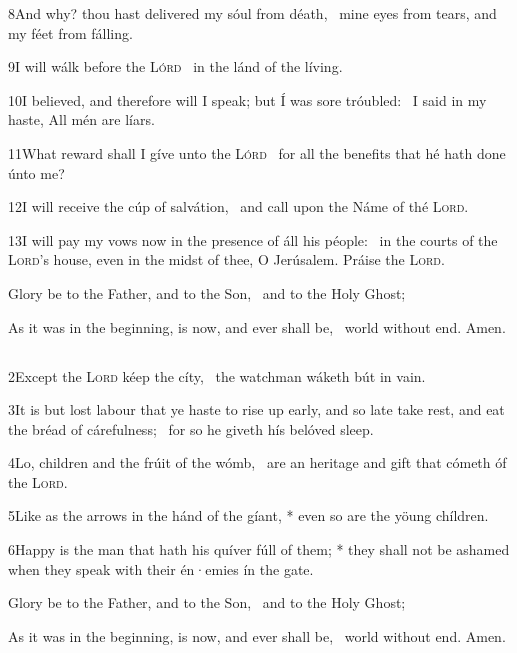 8\enspace And why? thou hast delivered my  sóul from déath, \star\ mine eyes from tears, and my féet from fálling.

9\enspace I will wálk before the {\scshape Lórd} \star\  in the lánd  of the líving.

10\enspace I believed, and therefore will I speak; but Í  was sore tróubled: \star\  I said in my haste, All mén are líars.

11\enspace What reward shall I gíve unto the {\scshape Lórd} \star\  for all the benefits that hé hath done únto me?

12\enspace I will receive the cúp of salvátion, \star\  and call upon the Náme of thé {\scshape Lord}.

13\enspace I will pay my vows now in the presence of áll his péople: \star\   in the courts of the {\scshape Lord}’s house, even in the midst of thee, O Jerúsalem. Práise the {\scshape Lord}.

Glory be to the Father, and to the Son, \star\  and to the Holy Ghost;

As it was in the beginning, is now, and ever shall be, \star\  world without end. Amen.

\medskip
\centerline{}
\subsection[{Psalm 127}]{}

2\enspace Except the {\scshape Lord} kéep the cíty,  \star\  the watchman wáketh bút in vain.

3\enspace It is but lost labour that ye haste to rise up early, and so late take rest, and eat the bréad of cárefulness;  \star\  for so he giveth hís belóved sleep.

4\enspace Lo, children and the frúit of the wómb,  \star\  are an heritage and gift that cómeth óf the {\scshape Lord}.

5\enspace Like as the arrows in the hánd of the gíant, * even so are the yöung chíldren.

6\enspace Happy is the man that hath his quíver fúll of them; * they shall not be ashamed when they speak with their én·emies ín the gate.

Glory be to the Father, and to the Son, \star\  and to the Holy Ghost;

As it was in the beginning, is now, and ever shall be, \star\  world without end. Amen.


